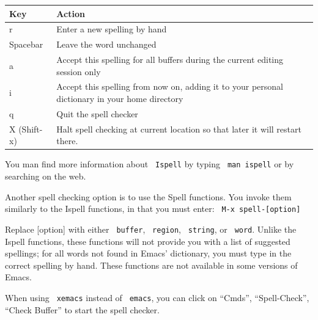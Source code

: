 \documentclass[bachelor,       %
               twoside,        %
               BCOR10mm,       %
               ngerman,english  %
               ]{GAUBM}
\begin{document}
\begin{table}[h]
\begin{tabular}{lp{12cm}}
Key         & Action\\ \hline
r           & Enter a new spelling by hand \\
Spacebar    & Leave the word unchanged\\
a           & Accept this spelling for all buffers during the current
              editing session only\\
i           & Accept this spelling from now on, adding it to your personal
              dictionary in your home directory\\
q           & Quit the spell checker\\
X (Shift-x) & Halt spell checking at current location so that
              later it will restart there.\\ \hline
\end{tabular}
\end{table}

You man find more information about \texttt{ Ispell} by typing \texttt{ man
  ispell} or by searching on the web.

Another spell checking option is to use the Spell functions. You
invoke them similarly to the Ispell functions, in that you must enter:
\texttt{ M-x spell-[option]}

Replace [option] with either \texttt{ buffer}, \texttt{ region}, \texttt{ string},
or \texttt{ word}.  Unlike the Ispell functions, these functions will not
provide you with a list of suggested spellings; for all words not
found in Emacs' dictionary, you must type in the correct spelling by
hand. These functions are not available in some versions of Emacs.

When using \texttt{ xemacs} instead of \texttt{ emacs}, you can click on ``Cmds'',
``Spell-Check'', ``Check Buffer'' to start the spell checker.
\end{document}
